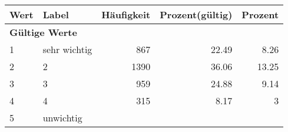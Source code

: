      \begin{longtable}{lXrrr}
     \toprule
     \textbf{Wert} & \textbf{Label} & \textbf{Häufigkeit} & \textbf{Prozent(gültig)} & \textbf{Prozent} \\
     \endhead
     \midrule
     \multicolumn{5}{l}{\textbf{Gültige Werte}}\\

     1 &
     \multicolumn{1}{X}{ sehr wichtig   } &


       \num{867} &
       \num[round-mode=places,round-precision=2]{22.49} &
         \num[round-mode=places,round-precision=2]{8.26} \\

     2 &
     \multicolumn{1}{X}{ 2   } &


       \num{1390} &
       \num[round-mode=places,round-precision=2]{36.06} &
         \num[round-mode=places,round-precision=2]{13.25} \\

     3 &
     \multicolumn{1}{X}{ 3   } &


       \num{959} &
       \num[round-mode=places,round-precision=2]{24.88} &
         \num[round-mode=places,round-precision=2]{9.14} \\

     4 &
     \multicolumn{1}{X}{ 4   } &


       \num{315} &
       \num[round-mode=places,round-precision=2]{8.17} &
         \num[round-mode=places,round-precision=2]{3} \\

     5 &
     \multicolumn{1}{X}{ unwichtig   } &



\end{longtable}
